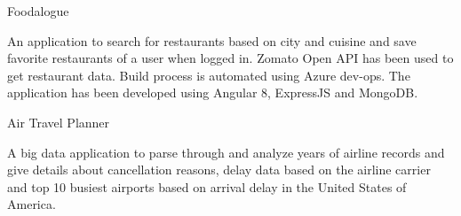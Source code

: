 
\begin{cventries}
  \cventry
    {} %
    {Foodalogue} %
    {} %
    {} %
    {
      \begin{cvitems} %
        \item {An application to search for restaurants based on city and cuisine and save favorite restaurants of a user when logged in. Zomato Open API has been used to get restaurant data. Build process is automated using Azure dev-ops. The application has been developed using Angular 8, ExpressJS and MongoDB.}
      \end{cvitems}
    }
    
  \cventry
    {} %
    {Air Travel Planner} %
    {} %
    {} %
    {
      \begin{cvitems} %
        \item {A big data application to parse through and analyze years of airline records and give details about cancellation reasons, delay data based on the airline carrier and top 10 busiest airports based on arrival delay in the United States of America. }
      \end{cvitems}
    }
\end{cventries}